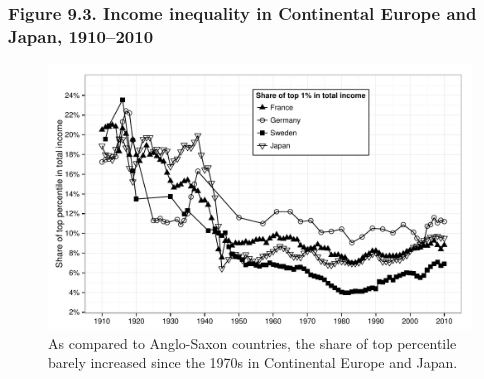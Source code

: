 \documentclass[t]{beamer}\usepackage[]{graphicx}\usepackage[]{color}
\newenvironment{knitrout}{}{} %
\begin{document}
\begin{frame}[label=Figure_9_3]
\frametitle{Figure 9.3. Income inequality in Continental Europe and Japan, 1910--2010}
\begin{figure}[t]
\begin{minipage}[b]{\textwidth}
\centering
\begin{knitrout}\footnotesize
{}\color{fgcolor}

{\centering \includegraphics[width=1\linewidth]{figures/bw/Figure_9_3} 

}



\end{knitrout}
\caption{As compared to Anglo-Saxon countries, the share of top percentile barely increased since the 1970s in Continental Europe and Japan.}
\end{minipage}
\end{figure}
\end{frame}
\end{document}
